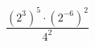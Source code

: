 \begin{ex}[type=calculate]
	\begin{condition}
		\( \dfrac{(2^3)^5\cdot(2^{-6})^2}{4^2} \)
	\end{condition}
\end{ex}